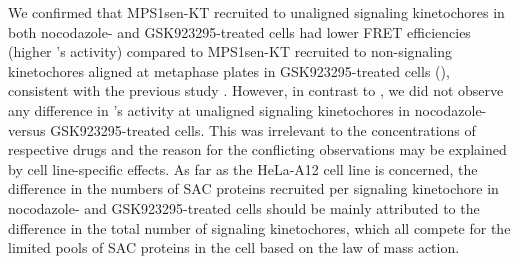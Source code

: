 We confirmed that MPS1sen-KT recruited to unaligned signaling kinetochores in both nocodazole- and GSK923295-treated cells had lower FRET efficiencies (higher 's activity) compared to MPS1sen-KT recruited to non-signaling kinetochores aligned at metaphase plates in GSK923295-treated cells (), consistent with the previous study \cite{MPS1senor}. However, in contrast to \cite{MPS1senor}, we did not observe any difference in 's activity at unaligned signaling kinetochores in nocodazole- versus GSK923295-treated cells. This was irrelevant to the concentrations of respective drugs and the reason for the conflicting observations may be explained by cell line-specific effects. As far as the HeLa-A12 cell line is concerned, the difference in the numbers of SAC proteins recruited per signaling kinetochore in nocodazole- and GSK923295-treated cells should be mainly attributed to the difference in the total number of signaling kinetochores, which all compete for the limited pools of SAC proteins in the cell based on the law of mass action.



